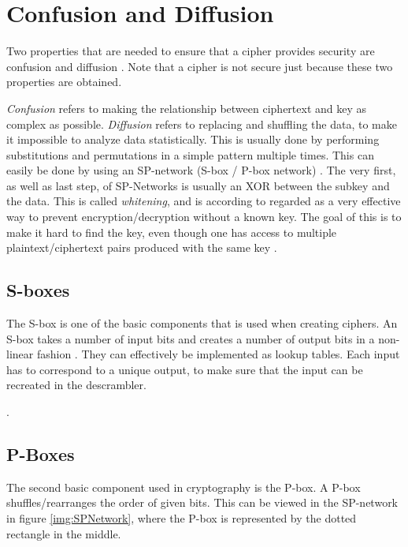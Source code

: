 
\section{Confusion and Diffusion}\label{ch:ConfDiff}
Two properties that are needed to ensure that a cipher provides security are 
confusion and diffusion \citep{Shannon:1949}. Note that a cipher is not secure 
just because these two properties are obtained.

\emph{Confusion} refers to making the relationship between ciphertext and key as 
complex as possible. \emph{Diffusion} refers to replacing and shuffling the 
data, to make it impossible to analyze data statistically. This is usually done 
by performing substitutions and permutations in a simple pattern multiple times. 
This can easily be done by using an SP-network (S-box / P-box network) 
\citep[pp. 74--79]{Stinson:2006}. The very first, as well as last step, of 
SP-Networks is usually an XOR between the subkey and the data. This is called 
\emph{whitening}, and is according to \citet[p. 75]{Stinson:2006} regarded as a 
very effective way to prevent encryption/decryption without a known key. 
The goal of this is to make it hard to find the key, even though one has access 
to multiple plaintext/ciphertext pairs produced with the same key 
\citep{Shannon:1949}.

\subsection{S-boxes}
The S-box is one of the basic components that is used when creating ciphers. 
An S-box takes a number of input bits and creates a number of output bits in 
a non-linear fashion \citep[pp. 74--75]{Stinson:2006}. They can effectively be 
implemented as lookup tables. Each input has to correspond to a unique output, 
to make sure that the input can be recreated in the descrambler.

. 


\subsection{P-Boxes}
The second basic component used in cryptography is the P-box. A P-box 
shuffles/rearranges the order of given bits. This can be viewed in the 
SP-network in figure \ref{img:SPNetwork}, where the P-box is represented by the 
dotted rectangle in the middle.

